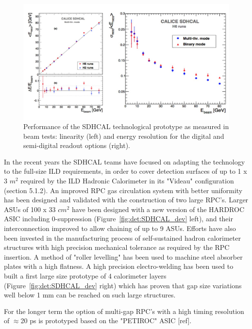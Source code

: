 \begin{figure}[t!]
\centering
\includegraphics[width=1.0\hsize]{Detector/fig/SDHCAL_performance.jpg}
\caption{Performance of the SDHCAL technological prototype as measured in beam tests: linearity (left) and energy resolution for the digital and semi-digital readout options (right).}
\label{fig:det:SDHCAL_perf}
\end{figure}

In the recent years the SDHCAL teams have focused on adapting the technology to the full-size ILD requirements, in order to cover detection surfaces of up to 1 x 3 $m^2$ required by the ILD Hadronic Calorimeter in its "Videau" configuration (section 5.1.2). An improved RPC gas circulation system with better uniformity has been designed and validated with the construction of two large RPC's. Larger ASUs of 100 x 33 $cm^2$ have been designed with a new version of the HARDROC ASIC including 0-suppression (Figure~\ref{fig:det:SDHCAL_dev} left), and their interconnection improved to allow chaining of up to 9 ASUs. Efforts have also been invested in the manufacturing process of self-sustained hadron calorimeter structures with high precision mechanical tolerance as required by the RPC insertion. A method of "roller levelling" has been used to machine steel absorber plates with a high flatness. A high precision electro-welding has been used to built a first large size prototype of 4 calorimeter layers (Figure~\ref{fig:det:SDHCAL_dev} right) which has proven that gap size variations well below 1 mm can be reached on such large structures. 

For the longer term the option of multi-gap RPC's with a high timing resolution of $\approx$20 ps is prototyped based on the "PETIROC" ASIC [ref]. 

